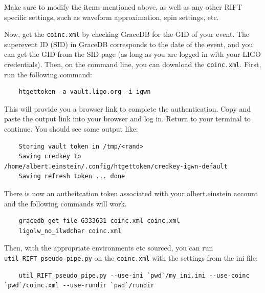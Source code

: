 \documentclass{article}
\begin{document}

Make sure to modify the items mentioned above, as well as any other RIFT specific settings, such as waveform approximation, spin settings, etc. 

\newpage
Now, get the \texttt{coinc.xml} by checking GraceDB for the GID of your event. The superevent ID (SID) in GraceDB corresponds to the date of the event, and you can get the GID from the SID page (as long as you are logged in with your LIGO credentials). Then, on the command line, you can download the \texttt{coinc.xml}. First, run the following command:

\begin{verbatim}
    htgettoken -a vault.ligo.org -i igwn
\end{verbatim}

This will provide you a browser link to complete the authentication. Copy and paste the output link into your browser and log in. Return to your terminal to continue. You should see some output like:

\begin{verbatim}
    Storing vault token in /tmp/<rand>
    Saving credkey to /home/albert.einstein/.config/htgettoken/credkey-igwn-default
    Saving refresh token ... done
\end{verbatim}

There is now an autheitcation token associated with your albert.einstein account and the following commands will work.

\begin{verbatim}
    gracedb get file G333631 coinc.xml coinc.xml
    ligolw_no_ilwdchar coinc.xml
\end{verbatim}

Then, with the appropriate environments etc sourced, you can run \texttt{util\_RIFT\_pseudo\_pipe.py} on the \texttt{coinc.xml} with the settings from the ini file:

\begin{verbatim}
    util_RIFT_pseudo_pipe.py --use-ini `pwd`/my_ini.ini --use-coinc `pwd`/coinc.xml --use-rundir `pwd`/rundir
\end{verbatim}
\end{document}
